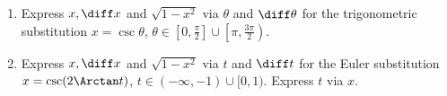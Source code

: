 \begin{enumerate}[ref={\fcProblemRef}]
\item \label{problemTheoreticalTrigSubx=csct} Express $x, \diff x $ and $\sqrt{1-x^2 }$ via $\theta$ and $\diff \theta$ for the trigonometric substitution $x=\csc \theta $, $\theta\in \left[0, \frac{\pi}{2}\right]\cup \left[\pi, \frac{3\pi}{2}\right)$.
\item \label{problemTheoreticalTrigSubx=csc(2arctant)} Express $x, \diff x $ and $\sqrt{1-x^2}$ via $t$ and $\diff t$ for the Euler substitution $x=\csc(2\Arctan t)$, $t\in(-\infty, -1)\cup [0,1)$. Express $t$ via $x$.
\end{enumerate}
